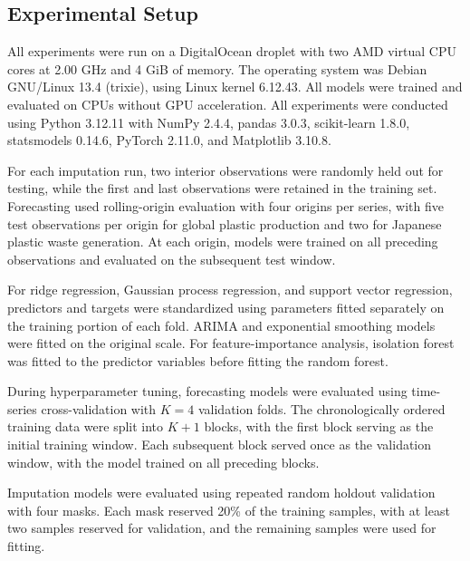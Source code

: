 \subsection{Experimental Setup}

All experiments were run on a DigitalOcean droplet with two AMD virtual CPU cores at 2.00 GHz and 4 GiB of memory.
The operating system was Debian GNU/Linux 13.4 (trixie), using Linux kernel 6.12.43.
All models were trained and evaluated on CPUs without GPU acceleration.
All experiments were conducted using Python 3.12.11 with NumPy 2.4.4, pandas 3.0.3, scikit-learn 1.8.0, statsmodels 0.14.6, PyTorch 2.11.0, and Matplotlib 3.10.8.

For each imputation run, two interior observations were randomly held out for testing, while the first and last observations were retained in the training set.
Forecasting used rolling-origin evaluation with four origins per series, with five test observations per origin for global plastic production and two for Japanese plastic waste generation.
At each origin, models were trained on all preceding observations and evaluated on the subsequent test window.

For ridge regression, Gaussian process regression, and support vector regression, predictors and targets were standardized using parameters fitted separately on the training portion of each fold.
ARIMA and exponential smoothing models were fitted on the original scale.
For feature-importance analysis, isolation forest was fitted to the predictor variables before fitting the random forest.

During hyperparameter tuning, forecasting models were evaluated using time-series cross-validation with \(K = 4\) validation folds.
The chronologically ordered training data were split into \(K + 1\) blocks, with the first block serving as the initial training window.
Each subsequent block served once as the validation window, with the model trained on all preceding blocks.

Imputation models were evaluated using repeated random holdout validation with four masks.
Each mask reserved 20\% of the training samples, with at least two samples reserved for validation, and the remaining samples were used for fitting.
